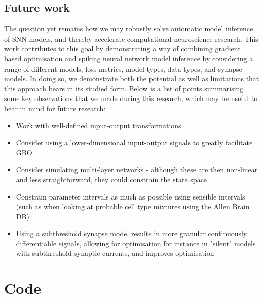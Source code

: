 \documentclass[mphil,deptreport,ianc]{infthesis} %
\begin{document}


\section*{Future work}

The question yet remains how we may robustly solve automatic model inference of SNN models, and thereby accelerate computational neuroscience research.
This work contributes to this goal by demonstrating a way of combining gradient based optimisation and spiking neural network model inference by considering a range of different models, loss metrics, model types, data types, and synapse models.
In doing so, we demonstrate both the potential as well as limitations that this approach bears in its studied form.
Below is a list of points summarising some key observations that we made during this research, which may be useful to bear in mind for future research:

\begin{itemize}
    \item Work with well-defined input-output transformations
    \item Consider using a lower-dimensional input-output signals to greatly facilitate GBO
    \item Consider simulating multi-layer networks - although these are then non-linear and less straightforward, they could constrain the state space
    \item Constrain parameter intervals as much as possible using sensible intervals (such as when looking at probable cell type mixtures using the Allen Brain DB)
    \item Using a subthreshold synapse model results in more granular continuously differentiable signals, allowing for optimisation for instance in "silent" models with subthreshold synaptic currents, and improves optimisation
\end{itemize}








\appendix

\chapter{Code}
\label{appendix:code}
\end{document}
